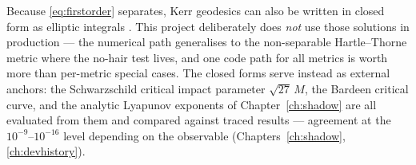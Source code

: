 Because \eqref{eq:firstorder} separates, Kerr geodesics can also be
written in closed form as elliptic integrals
\citep{Darwin1959,RauchBlandford1994,GrallaLupsasca2020}. This project
deliberately does \emph{not} use those solutions in production — the
numerical path generalises to the non-separable Hartle--Thorne metric
where the no-hair test lives, and one code path for all metrics is worth
more than per-metric special cases. The closed forms serve instead as
external anchors: the Schwarzschild critical impact parameter
$\sqrt{27}\,M$, the Bardeen critical curve, and the analytic Lyapunov
exponents of Chapter~\ref{ch:shadow} are all evaluated from them and
compared against traced results — agreement at the $10^{-9}$--$10^{-16}$
level depending on the observable (Chapters~\ref{ch:shadow},
\ref{ch:devhistory}).

